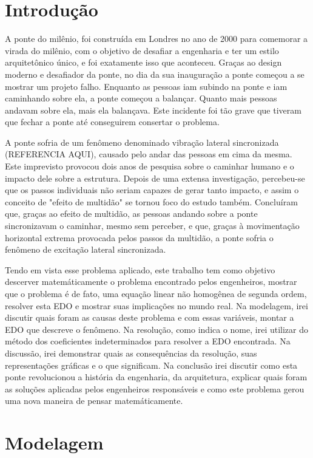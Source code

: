 \documentclass[12pt]{article}
\begin{document}
\section{Introdução}

A ponte do milênio, foi construída em Londres no ano de 2000 para comemorar
a virada do milênio, com o objetivo de desafiar a engenharia e ter um estilo arquitetônico único, e foi exatamente isso que aconteceu.
Graças ao design moderno e desafiador da ponte, no dia da sua inauguração a ponte começou a se mostrar um projeto falho.
Enquanto as pessoas iam subindo na ponte e iam caminhando sobre ela, a ponte começou a balançar. Quanto mais pessoas andavam sobre ela,
mais ela balançava. Este incidente foi tão grave que tiveram que fechar a ponte até conseguirem consertar o problema.

A ponte sofria de um fenômeno denominado vibração lateral sincronizada (REFERENCIA AQUI), causado pelo andar das pessoas em cima da mesma.
Este imprevisto provocou dois anos de pesquisa sobre o caminhar humano e o impacto dele sobre a estrutura. 
Depois de uma extensa investigação, percebeu-se que os passos individuais não seriam capazes de gerar tanto impacto, e assim
o conceito de "efeito de multidão" se tornou foco do estudo também. Concluíram que, graças ao efeito de multidão,
as pessoas andando sobre a ponte sincronizavam o caminhar, mesmo sem perceber, e que, graças à movimentação horizontal extrema provocada pelos
passos da multidão, a ponte sofria o fenômeno de excitação lateral sincronizada.

Tendo em vista esse problema aplicado, este trabalho tem como objetivo descerver matemáticamente
o problema encontrado pelos engenheiros, mostrar que o problema é de fato, uma equação linear não 
homogênea de segunda ordem, resolver esta EDO e mostrar suas implicações no mundo real.
Na modelagem, irei discutir quais foram as causas deste problema e com essas variáveis, montar a EDO que
descreve o fenômeno. Na resolução, como indica o nome, irei utilizar do método dos coeficientes indeterminados
para resolver a EDO encontrada. Na discussão, irei demonstrar quais as consequências da resolução, suas representações
gráficas e o que significam.
Na conclusão irei discutir como esta ponte revolucionou a história da engenharia, da arquitetura, explicar quais foram as soluções 
aplicadas pelos engenheiros responsáveis e como este problema gerou uma nova maneira de pensar matemáticamente.

\pagebreak 
\section{Modelagem}
\end{document}
